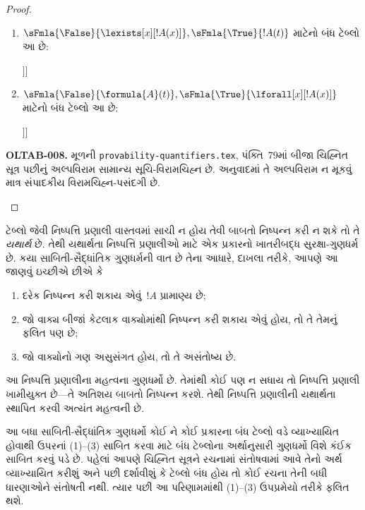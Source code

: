 \begin{proof}
\begin{enumerate}
\item $\sFmla{\False}{\lexists[x][!A(x)]},
  \sFmla{\True}{!A(t)}$ માટેનો બંધ ટેબ્લો આ છે:
  \begin{oltableau}
    [\sFmla{\False}{\lexists[x][\formula{A}(x)]}, just = \TAss
      [\sFmla{\True}{\formula{A}(t)}, just = \TAss
        [\sFmla{\False}{\formula{A}(t)}, just = {\TRule{\False}{\lexists}[1]}, close]]]
    \end{oltableau}
\item $\sFmla{\False}{\formula{A}(t)},
  \sFmla{\True}{\lforall[x][!A(x)]}$ માટેનો બંધ ટેબ્લો આ છે:
  \begin{oltableau}
    [\sFmla{\False}{\formula{A}(t)}, just = \TAss
      [\sFmla{\True}{\lforall[x][\formula{A}(x)]}, just = \TAss
        [\sFmla{\True}{\formula{A}(t)}, just = {\TRule{\True}{\lforall}[2]}, close]]]
    \end{oltableau}
\end{enumerate}
\begin{editorial}
\textbf{OLTAB-008.} મૂળની \texttt{provability-quantifiers.tex}, પંક્તિ~79માં બીજા ચિહ્નિત સૂત્ર પછીનું અલ્પવિરામ સામાન્ય સૂચિ-વિરામચિહ્ન છે. અનુવાદમાં તે અલ્પવિરામ ન મૂકવું માત્ર સંપાદકીય વિરામચિહ્ન-પસંદગી છે.
\end{editorial}
\end{proof}
\endgroup


\begingroup
\makeatletter{}\makeatother


\label{guunit:OLP-0109}


\begin{explain}
ટેબ્લો જેવી નિષ્પત્તિ પ્રણાલી વાસ્તવમાં સાચી ન હોય તેવી બાબતો
નિષ્પન્ન કરી ન શકે તો તે \emph{યથાર્થ} છે. તેથી યથાર્થતા
નિષ્પત્તિ પ્રણાલીઓ માટે એક પ્રકારનો ખાતરીબદ્ધ સુરક્ષા-ગુણધર્મ છે.
કયા સાબિતી-સૈદ્ધાંતિક ગુણધર્મની વાત છે તેના આધારે, દાખલા તરીકે, આપણે
આ જાણવું ઇચ્છીએ છીએ કે
\begin{enumerate}
\item દરેક નિષ્પન્ન કરી શકાય એવું~$!A$ પ્રામાણ્ય છે;
\item જો વાક્ય બીજાં કેટલાક વાક્યોમાંથી નિષ્પન્ન કરી શકાય એવું હોય, તો
  તે તેમનું ફલિત પણ છે;
\item જો વાક્યોનો ગણ અસુસંગત હોય, તો તે અસંતોષ્ય છે.
\end{enumerate}
આ નિષ્પત્તિ પ્રણાલીના મહત્વના ગુણધર્મો છે. તેમાંથી કોઈ પણ ન સધાય
તો નિષ્પત્તિ પ્રણાલી ખામીયુક્ત છે---તે અતિશય બાબતો નિષ્પન્ન કરશે.
તેથી નિષ્પત્તિ પ્રણાલીની યથાર્થતા સ્થાપિત કરવી અત્યંત મહત્વની છે.

આ બધા સાબિતી-સૈદ્ધાંતિક ગુણધર્મો કોઈ ને કોઈ પ્રકારના બંધ
ટેબ્લો વડે વ્યાખ્યાયિત હોવાથી ઉપરનાં (1)--(3) સાબિત કરવા માટે
બંધ ટેબ્લોના અર્થાનુસારી ગુણધર્મો વિશે કંઈક સાબિત કરવું પડે છે.
પહેલાં આપણે ચિહ્નિત સૂત્રને રચનામાં સંતોષવામાં આવે તેનો અર્થ
વ્યાખ્યાયિત કરીશું અને પછી દર્શાવીશું કે ટેબ્લો બંધ હોય તો કોઈ
રચના તેની બધી ધારણાઓને સંતોષતી નથી. ત્યાર પછી આ પરિણામમાંથી (1)--(3)
ઉપપ્રમેયો તરીકે ફલિત થશે.
\end{explain}

